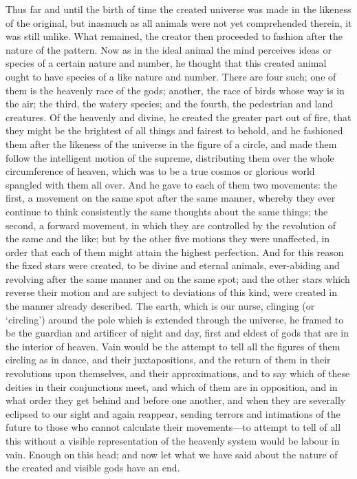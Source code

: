 \documentclass[11pt,letter]{article}
\begin{document}
\par  Thus far and until the birth of time the created universe was made in the likeness of the original, but inasmuch as all animals were not yet comprehended therein, it was still unlike. What remained, the creator then proceeded to fashion after the nature of the pattern. Now as in the ideal animal the mind perceives ideas or species of a certain nature and number, he thought that this created animal ought to have species of a like nature and number. There are four such; one of them is the heavenly race of the gods; another, the race of birds whose way is in the air; the third, the watery species; and the fourth, the pedestrian and land creatures. Of the heavenly and divine, he created the greater part out of fire, that they might be the brightest of all things and fairest to behold, and he fashioned them after the likeness of the universe in the figure of a circle, and made them follow the intelligent motion of the supreme, distributing them over the whole circumference of heaven, which was to be a true cosmos or glorious world spangled with them all over. And he gave to each of them two movements: the first, a movement on the same spot after the same manner, whereby they ever continue to think consistently the same thoughts about the same things; the second, a forward movement, in which they are controlled by the revolution of the same and the like; but by the other five motions they were unaffected, in order that each of them might attain the highest perfection. And for this reason the fixed stars were created, to be divine and eternal animals, ever-abiding and revolving after the same manner and on the same spot; and the other stars which reverse their motion and are subject to deviations of this kind, were created in the manner already described. The earth, which is our nurse, clinging (or ‘circling’) around the pole which is extended through the universe, he framed to be the guardian and artificer of night and day, first and eldest of gods that are in the interior of heaven. Vain would be the attempt to tell all the figures of them circling as in dance, and their juxtapositions, and the return of them in their revolutions upon themselves, and their approximations, and to say which of these deities in their conjunctions meet, and which of them are in opposition, and in what order they get behind and before one another, and when they are severally eclipsed to our sight and again reappear, sending terrors and intimations of the future to those who cannot calculate their movements—to attempt to tell of all this without a visible representation of the heavenly system would be labour in vain. Enough on this head; and now let what we have said about the nature of the created and visible gods have an end.
\end{document}
